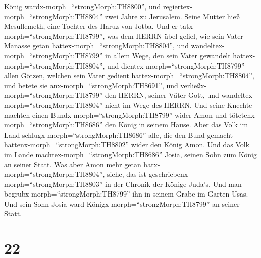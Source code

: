 König wardx-morph=``strongMorph:TH8800'', und
regiertex-morph=``strongMorph:TH8804'' zwei Jahre zu Jerusalem. Seine
Mutter hieß Mesullemeth, eine Tochter des Haruz von Jotba. 
Und er tatx-morph=``strongMorph:TH8799'', was dem HERRN übel gefiel, wie
sein Vater Manasse getan hattex-morph=``strongMorph:TH8804'',
 und wandeltex-morph=``strongMorph:TH8799'' in allem Wege,
den sein Vater gewandelt hattex-morph=``strongMorph:TH8804'', und
dientex-morph=``strongMorph:TH8799'' allen Götzen, welchen sein Vater
gedient hattex-morph=``strongMorph:TH8804'', und betete sie
anx-morph=``strongMorph:TH8691'',  und
verließx-morph=``strongMorph:TH8799'' den HERRN, seiner Väter Gott, und
wandeltex-morph=``strongMorph:TH8804'' nicht im Wege des HERRN.
 Und seine Knechte machten einen
Bundx-morph=``strongMorph:TH8799'' wider Amon und
tötetenx-morph=``strongMorph:TH8686'' den König in seinem Hause.
 Aber das Volk im Land schlugx-morph=``strongMorph:TH8686''
alle, die den Bund gemacht hattenx-morph=``strongMorph:TH8802'' wider
den König Amon. Und das Volk im Lande
machtex-morph=``strongMorph:TH8686'' Josia, seinen Sohn zum König an
seiner Statt.  Was aber Amon mehr getan
hatx-morph=``strongMorph:TH8804'', siehe, das ist
geschriebenx-morph=``strongMorph:TH8803'' in der Chronik der Könige
Juda's.  Und man begrubx-morph=``strongMorph:TH8799'' ihn
in seinem Grabe im Garten Usas. Und sein Sohn Josia ward
Königx-morph=``strongMorph:TH8799'' an seiner Statt.

\hypertarget{section-21}{%
\section{22}\label{section-21}}

